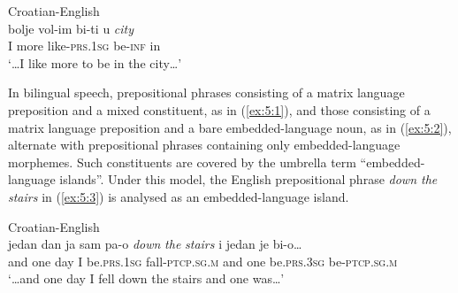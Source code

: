 \ea
\label{ex:5:2}
Croatian-English \citep[202]{hlavac-second-generation-2003}\\
 {bolje} {vol-im} {bi-ti} {u} \textit{city} \\
	{I} more like-\textsc{prs.1sg} be-\textsc{inf} in {}\\
\glt `\dots{}I like more to be in the city\dots{}'
\z

\noindent In bilingual speech, prepositional phrases consisting of a matrix language preposition and a mixed constituent, as in (\ref{ex:5:1}), and those consisting of a matrix language preposition and a bare embedded-language noun, as in (\ref{ex:5:2}), alternate with prepositional phrases containing only embedded-language morphemes. Such constituents are covered by the umbrella term “embedded-language islands”. Under this model, the English prepositional phrase \textit{down the stairs} in (\ref{ex:5:3}) is analysed as an embedded-language island.

\ea
\label{ex:5:3}
Croatian-English \citep[227]{hlavac-second-generation-2003}\\
 {jedan} {dan} {ja} {sam} {pa-o} \textit{down} \textit{the} \textit{stairs} {i} {jedan} {je} {bi-o\dots{}}\\
	{and} one day I be.\textsc{prs.1sg} fall-\textsc{ptcp.sg.m} {} {} {} and one be.\textsc{prs.3sg} be-\textsc{ptcp.sg.m}\\
\glt `\dots{}and one day I fell down the stairs and one was\dots{}'
\z

